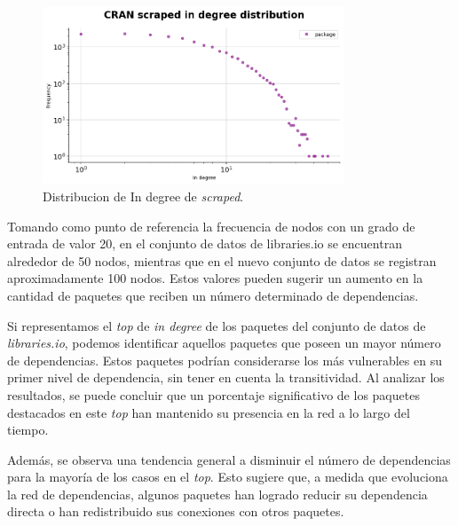 \begin{figure}[h!]
    \begin{center}
        \includegraphics[width=0.8\textwidth]{img/cran/ind_scr.png}
        \caption{Distribucion de In degree de \textit{scraped}.}
        \label{fig:cran_in_scraped}
    \end{center}
\end{figure}

Tomando como punto de referencia la frecuencia de nodos con un grado de entrada de valor 20,
en el conjunto de datos de libraries.io se encuentran alrededor de 50 nodos, mientras que en
el nuevo conjunto de datos se registran aproximadamente 100 nodos. Estos valores pueden sugerir
un aumento en la cantidad de paquetes que reciben un número determinado de dependencias.


Si representamos el \textit{top} de \textit{in degree} de los paquetes del conjunto de datos
de \textit{libraries.io}, podemos identificar aquellos paquetes que poseen un mayor número de
dependencias. Estos paquetes podrían considerarse los más vulnerables en su primer nivel de dependencia,
sin tener en cuenta la transitividad. Al analizar los resultados, se puede concluir que un porcentaje
significativo de los paquetes destacados en este \textit{top} han mantenido su presencia en la red a
lo largo del tiempo.

Además, se observa una tendencia general a disminuir el número de dependencias para la mayoría de
los casos en el \textit{top}. Esto sugiere que, a medida que evoluciona la red de dependencias,
algunos paquetes han logrado reducir su dependencia directa o han redistribuido sus conexiones
con otros paquetes.


